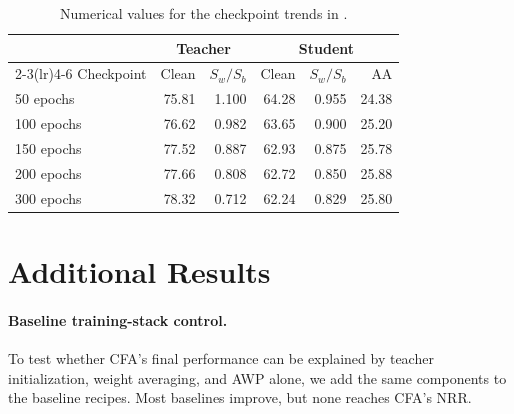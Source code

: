 \begin{table}[!htbp]
  \centering \small \setlength{\tabcolsep}{4pt}
  \caption{Numerical values for the checkpoint trends in .}
  \label{tab:teacherladder_values}
  \begin{tabular}{lrrrrr}
    \toprule
    & \multicolumn{2}{c}{Teacher} & \multicolumn{3}{c}{Student} \\
    \cmidrule(lr){2-3}\cmidrule(lr){4-6}
    Checkpoint & Clean & $S_w/S_b$ & Clean & $S_w/S_b$ & AA \\
    \midrule
    50 epochs  & 75.81 & 1.100 & 64.28 & 0.955 & 24.38 \\
    100 epochs & 76.62 & 0.982 & 63.65 & 0.900 & 25.20 \\
    150 epochs & 77.52 & 0.887 & 62.93 & 0.875 & 25.78 \\
    200 epochs & 77.66 & 0.808 & 62.72 & 0.850 & 25.88 \\
    300 epochs & 78.32 & 0.712 & 62.24 & 0.829 & 25.80 \\
    \bottomrule
  \end{tabular}
\end{table}

\section{Additional Results}

\paragraph{Baseline training-stack control.}
To test whether CFA's final performance can be explained by teacher
initialization, weight averaging, and AWP alone, we add the same components to
the baseline recipes. Most baselines improve, but none reaches CFA's NRR.

